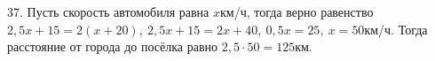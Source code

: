 37. Пусть скорость автомобиля равна $x$км/ч, тогда верно равенство $2,5x+15=2(x+20),\ 2,5x+15=2x+40,\ 0,5x=25,\ x=50$км/ч. Тогда расстояние от города до посёлка равно $2,5\cdot50=125$км.\\

